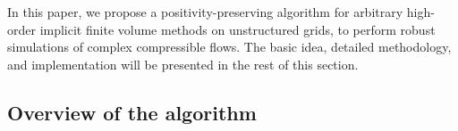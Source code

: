 In this paper, we propose a positivity-preserving algorithm for arbitrary high-order implicit finite volume methods on unstructured grids, to perform robust simulations of complex compressible flows. The basic idea, detailed methodology, and implementation will be presented in the rest of this section.

%

\subsection{Overview of the algorithm}

